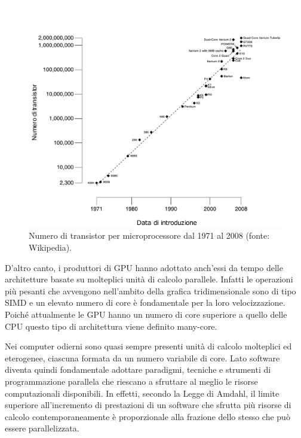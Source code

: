 \documentclass[12pt,a4paper,oneside]{book}
\begin{document}
\begin{figure}[t]
\begin{center}
\includegraphics[width=\textwidth]{img/moore-law}
\caption{Numero di transistor per microprocessore dal 1971 al 2008 (fonte: Wikipedia).\label{fig:moore-law}}
\end{center}
\end{figure}

D'altro canto, i produttori di \ac{GPU} hanno adottato anch'essi da tempo delle architetture basate su molteplici unità di calcolo parallele. Infatti le operazioni più pesanti che avvengono nell'ambito della grafica tridimensionale sono di tipo \ac{SIMD} e un elevato numero di core è fondamentale per la loro velocizzazione. Poiché attualmente le \ac{GPU} hanno un numero di core superiore a quello delle \ac{CPU} questo tipo di architettura viene definito many-core.

Nei computer odierni sono quasi sempre presenti unità di calcolo molteplici ed eterogenee, ciascuna formata da un numero variabile di core. Lato software diventa quindi fondamentale adottare paradigmi, tecniche e strumenti di programmazione parallela che riescano a sfruttare al meglio le risorse computazionali disponibili. In effetti, secondo la Legge di Amdahl, il limite superiore all'incremento di prestazioni di un software che sfrutta più risorse di calcolo contemporaneamente è proporzionale alla frazione dello stesso che può essere parallelizzata.
\end{document}
